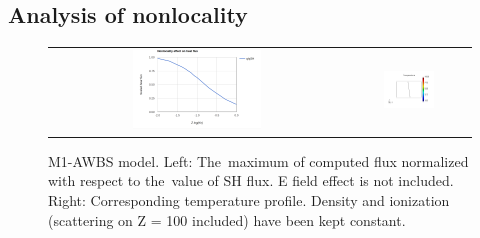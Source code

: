 \documentclass[review]{elsarticle}
\begin{document}
\subsection{Analysis of nonlocality}\label{sec:NonlocalityAnalysis}
\begin{figure}[tbh]
  \begin{center}
    \begin{tabular}{cc}
      \includegraphics[width=0.45\textwidth]{Nonlocality_analysis_woutE.png} &
	  \includegraphics[width=0.45\textwidth]{figs/temperature_p51DNonlocAnal.png} 
    \end{tabular}
  \caption{
    M1-AWBS model. Left: The~maximum of computed flux normalized with respect 
	to the~value of SH flux. E field effect is not included.  
	Right: Corresponding temperature profile. Density and ionization 
	(scattering on Z = 100 included) have been kept constant.
  }
  \end{center}
  \label{fig:nonlocality_analysis}
\end{figure}
\end{document}
